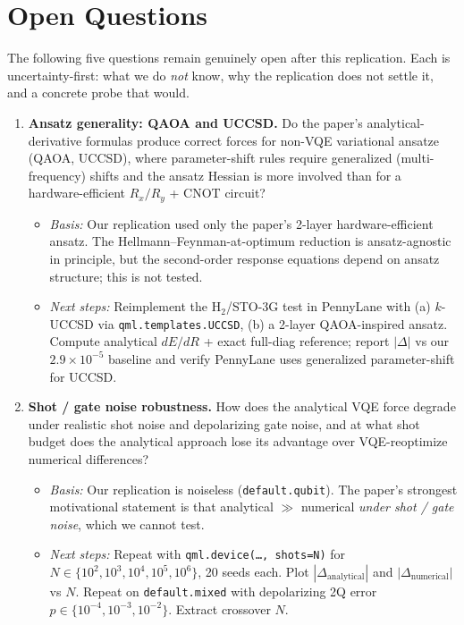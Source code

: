 \section{Open Questions}
\label{sec:open-questions}
The following five questions remain genuinely open after this replication. Each is
uncertainty-first: what we do \emph{not} know, why the replication does not settle it, and a
concrete probe that would.

\begin{enumerate}
\item \textbf{Ansatz generality: QAOA and UCCSD.} Do the paper's analytical-derivative formulas
produce correct forces for non-VQE variational ansatze (QAOA, UCCSD), where parameter-shift rules
require generalized (multi-frequency) shifts and the ansatz Hessian is more involved than for a
hardware-efficient $R_x/R_y$ + CNOT circuit?
\begin{itemize}
\item \emph{Basis:} Our replication used only the paper's 2-layer hardware-efficient ansatz. The
Hellmann--Feynman-at-optimum reduction is ansatz-agnostic in principle, but the second-order
response equations depend on ansatz structure; this is not tested.
\item \emph{Next steps:} Reimplement the H$_2$/STO-3G test in PennyLane with (a) $k$-UCCSD via
\texttt{qml.templates.UCCSD}, (b) a 2-layer QAOA-inspired ansatz. Compute analytical $dE/dR$ +
exact full-diag reference; report $|\Delta|$ vs our $2.9\times10^{-5}$ baseline and verify PennyLane
uses generalized parameter-shift for UCCSD.
\end{itemize}

\item \textbf{Shot / gate noise robustness.} How does the analytical VQE force degrade under
realistic shot noise and depolarizing gate noise, and at what shot budget does the analytical
approach lose its advantage over VQE-reoptimize numerical differences?
\begin{itemize}
\item \emph{Basis:} Our replication is noiseless (\texttt{default.qubit}). The paper's strongest
motivational statement is that analytical $\gg$ numerical \emph{under shot / gate noise}, which we
cannot test.
\item \emph{Next steps:} Repeat with \texttt{qml.device(\ldots, shots=N)} for $N\in\{10^2,10^3,10^4,10^5,10^6\}$,
20 seeds each. Plot $|\Delta_{\text{analytical}}|$ and $|\Delta_{\text{numerical}}|$ vs $N$. Repeat
on \texttt{default.mixed} with depolarizing 2Q error $p\in\{10^{-4},10^{-3},10^{-2}\}$. Extract
crossover $N$.
\end{itemize}


\end{enumerate}
